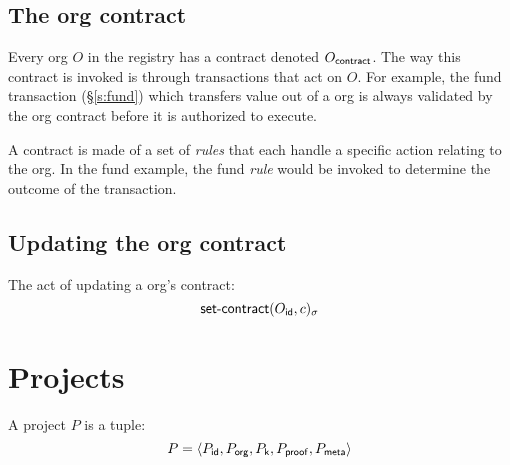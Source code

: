 \subsection{The org contract}
Every org $O$ in the registry has a contract denoted $O_{\mathsf{contract}}$.
The way this contract is invoked is through transactions that act on $O$. For
example, the \textsf{fund} transaction (\S\ref{s:fund}) which transfers value
out of a org is always validated by the org contract before it
is authorized to execute.

A contract is made of a set of \emph{rules} that each handle a specific action
relating to the org. In the \textsf{fund} example, the \textsf{fund}
\emph{rule} would be invoked to determine the outcome of the transaction.

\subsection{Updating the org contract}
The act of updating a org's contract:
\[
    \operatorname{\mathsf{set-contract}}\lparen O_{\mathsf{id}}, c\rparen_\sigma
\]



\section{Projects}
A project $P$ is a tuple:
\[
    P = \langle P_{\mathsf{id}}, P_{\mathsf{org}}, P_{\mathsf{k}}, P_{\mathsf{proof}}, P_{\mathsf{meta}}\rangle
\]

